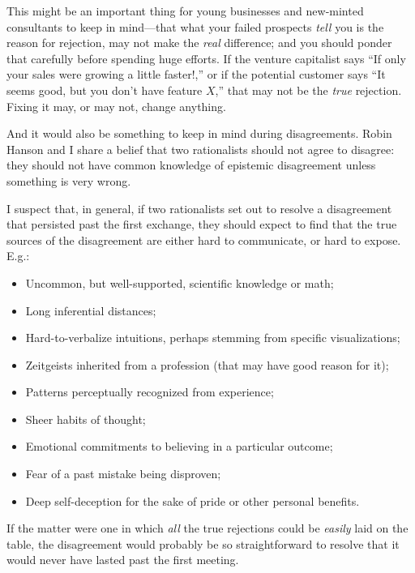 {
 This might be an important thing for young businesses and
new-minted consultants to keep in mind---that what your failed
prospects \textit{tell} you is the reason for rejection, may not make
the \textit{real} difference; and you should ponder that carefully
before spending huge efforts. If the venture capitalist says
``If only your sales were growing a little
faster!,'' or if the potential customer says
``It seems good, but you don't have
feature $X$,'' that may not be the \textit{true}
rejection. Fixing it may, or may not, change anything.}

{
 And it would also be something to keep in mind during
disagreements. Robin Hanson and I share a belief that two rationalists
should not agree to disagree: they should not have common knowledge of
epistemic disagreement unless something is very wrong.}

{
 I suspect that, in general, if two rationalists set out to resolve
a disagreement that persisted past the first exchange, they should
expect to find that the true sources of the disagreement are either
hard to communicate, or hard to expose. E.g.:}

\begin{itemize}
\item {
 Uncommon, but well-supported, scientific knowledge or math;}

\item {
 Long inferential distances;}

\item {
 Hard-to-verbalize intuitions, perhaps stemming from specific
visualizations;}

\item {
 Zeitgeists inherited from a profession (that may have good reason
for it);}

\item {
 Patterns perceptually recognized from experience;}

\item {
 Sheer habits of thought;}

\item {
 Emotional commitments to believing in a particular outcome;}

\item {
 Fear of a past mistake being disproven;}

\item {
 Deep self-deception for the sake of pride or other personal
 benefits.}
\end{itemize}

{
 If the matter were one in which \textit{all} the true rejections
could be \textit{easily} laid on the table, the disagreement would
probably be so straightforward to resolve that it would never have
lasted past the first meeting.}

